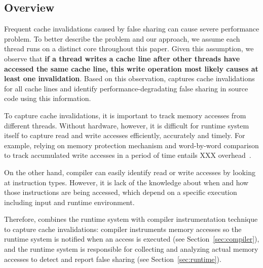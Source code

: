 \subsection{Overview}
\label{sec:overview}
Frequent cache invalidations caused by false sharing can cause severe performance problem.
To better describe the problem and our approach, we assume each thread runs on a distinct core throughout this
paper. Given this assumption, we observe that 
\textbf{if a thread writes a cache line after other threads have 
accessed the same cache line, this write operation most likely causes at least
one invalidation}. 
Based on this observation, \Defaults{} captures cache invalidations for all cache lines and 
identify performance-degradating false sharing in source code using this information.
 
To capture cache invalidations, it is important to track memory accesses from different 
threads. 
Without hardware, however, it is difficult for runtime system itself to capture read and write accesses efficiently, 
accurately and timely. 
For example, \Sheriff{} relying on memory protection mechanism and word-by-word
comparison to track accumulated write accesses in a period of time 
entails XXX overhead~\cite{sheriff}. 


On the other hand, compiler can easily identify  
read or write accesses by looking at instruction types. However,
it is lack of the knowledge about when and how those instructions are being accessed, 
which depend on a specific execution including input and runtime environment. 

Therefore,  combines the runtime system with compiler instrumentation technique to capture 
cache invalidations: compiler instruments memory accesses so the runtime
system is notified when an access is executed (see Section~\ref{sec:compiler}),
and the runtime system is responsible for collecting and analyzing actual memory accesses 
to detect and report false sharing (see Section~\ref{sec:runtime}).

